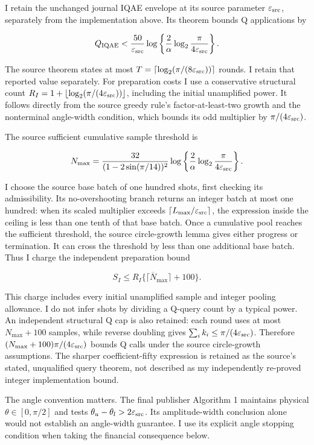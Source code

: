 I retain the unchanged journal IQAE envelope at its source parameter \(\varepsilon_{\rm src}\), separately from the implementation above. Its theorem bounds Q applications by

\[
 Q_{\rm IQAE}<\frac{50}{\varepsilon_{\rm src}}
 \log\left\{\frac2\alpha\log_2\frac\pi{4\varepsilon_{\rm src}}\right\}.
\]

The source theorem states at most \(T=\lceil\log_2(\pi/(8\varepsilon_{\rm src}))\rceil\) rounds. I retain that reported value separately. For preparation costs I use a conservative structural count \(R_I=1+\lfloor\log_2(\pi/(4\varepsilon_{\rm src}))\rfloor\), including the initial unamplified power. It follows directly from the source greedy rule's factor-at-least-two growth and the nonterminal angle-width condition, which bounds its odd multiplier by \(\pi/(4\varepsilon_{\rm src})\).

The source sufficient cumulative sample threshold is

\[
 N_{\max}=\frac{32}{(1-2\sin(\pi/14))^2}
 \log\left\{\frac2\alpha\log_2\frac\pi{4\varepsilon_{\rm src}}\right\}.
\]

I choose the source base batch of one hundred shots, first checking its admissibility. Its no-overshooting branch returns an integer batch at most one hundred: when its scaled multiplier exceeds \(\lceil L_{\max}/\varepsilon_{\rm src}\rceil\), the expression inside the ceiling is less than one tenth of that base batch. Once a cumulative pool reaches the sufficient threshold, the source circle-growth lemma gives either progress or termination. It can cross the threshold by less than one additional base batch. Thus I charge the independent preparation bound

\[
 S_I\leq R_I\{\lceil\overline N_{\max}\rceil+100\}.
\]

This charge includes every initial unamplified sample and integer pooling allowance. I do not infer shots by dividing a Q-query count by a typical power. An independent structural Q cap is also retained: each round uses at most \(N_{\max}+100\) samples, while reverse doubling gives \(\sum_i k_i\leq\pi/(4\varepsilon_{\rm src})\). Therefore \((N_{\max}+100)\pi/(4\varepsilon_{\rm src})\) bounds Q calls under the source circle-growth assumptions. The sharper coefficient-fifty expression is retained as the source's stated, unqualified query theorem, not described as my independently re-proved integer implementation bound.

The angle convention matters. The final publisher Algorithm 1 maintains physical \(\theta\in[0,\pi/2]\) and tests \(\theta_u-\theta_l>2\varepsilon_{\rm src}\). Its amplitude-width conclusion alone would not establish an angle-width guarantee. I use its explicit angle stopping condition when taking the financial consequence below.

